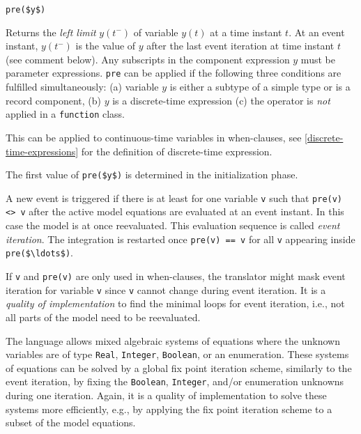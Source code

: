 \begin{operatordefinition}[pre]
\begin{synopsis}\begin{lstlisting}
pre($y$)
\end{lstlisting}\end{synopsis}
\begin{semantics}
Returns the \emph{left limit} $y(t^{-})$ of variable $y(t)$ at a time instant $t$.
At an event instant, $y(t^{-})$ is the value of $y$ after the last event iteration at time instant $t$ (see comment below).
Any subscripts in the component expression $y$ must be parameter expressions.
\lstinline!pre! can be applied if the following three conditions are fulfilled simultaneously: (a) variable $y$ is either a subtype of a simple type or is a record component, (b) $y$ is a discrete-time expression (c) the operator is \emph{not} applied in a \lstinline!function! class.
\begin{nonnormative}
This can be applied to continuous-time variables in when-clauses, see \cref{discrete-time-expressions} for the definition of discrete-time expression.
\end{nonnormative}
The first value of \lstinline!pre($y$)! is determined in the initialization phase.

A new event is triggered if there is at least for one variable \lstinline!v! such that \lstinline!pre(v) <> v! after the active model equations are evaluated at an event instant.  In this case the model is at once reevaluated.  This evaluation sequence is called \emph{event iteration}.  The integration is restarted once \lstinline!pre(v) == v! for all \lstinline!v! appearing inside \lstinline!pre($\ldots$)!.

\begin{nonnormative}
If \lstinline!v! and \lstinline!pre(v)! are only used in when-clauses, the translator might mask event iteration for variable \lstinline!v! since \lstinline!v! cannot change during event iteration.  It is a \emph{quality of implementation} to find the minimal loops for event iteration, i.e., not all parts of the model need to be reevaluated.

The language allows mixed algebraic systems of equations where the unknown variables are of type \lstinline!Real!, \lstinline!Integer!, \lstinline!Boolean!, or an enumeration.  These systems of equations can be solved by a global fix point iteration scheme, similarly to the event iteration, by fixing the \lstinline!Boolean!, \lstinline!Integer!, and/or enumeration unknowns during one iteration.  Again, it is a quality of implementation to solve these systems more efficiently, e.g., by applying the fix point iteration scheme to a subset of the model equations.
\end{nonnormative}
\end{semantics}
\end{operatordefinition}

